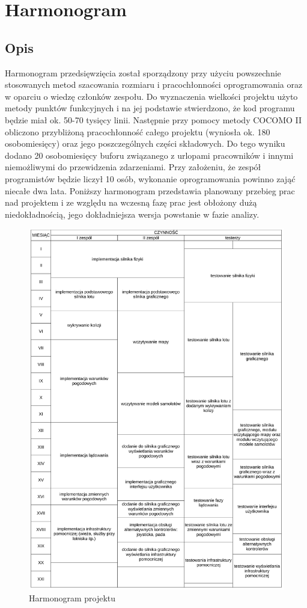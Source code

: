 \documentclass{mwrep}
\begin{document}
\chapter{Harmonogram}

\section{Opis}
Harmonogram przedsięwzięcia został sporządzony przy użyciu powszechnie stosowanych metod szacowania rozmiaru i pracochłonności oprogramowania oraz w oparciu o wiedzę członków zespołu. Do wyznaczenia wielkości projektu użyto metody punktów funkcyjnych i na jej podstawie stwierdzono, że kod programu będzie miał ok. 50-70 tysięcy linii. Następnie przy pomocy metody COCOMO II obliczono przybliżoną pracochłonność całego projektu (wyniosła ok. 180 osobomiesięcy) oraz jego poszczególnych części składowych. Do tego wyniku dodano 20 osobomiesięcy buforu związanego z urlopami pracowników i innymi niemożliwymi do przewidzenia zdarzeniami. Przy założeniu, że zespół programistów będzie liczył 10 osób, wykonanie oprogramowania powinno zająć niecałe dwa lata.
Poniższy harmonogram przedstawia planowany przebieg prac nad projektem i ze względu na wczesną fazę prac jest obłożony dużą niedokładnością, jego dokładniejsza wersja powstanie w fazie analizy. 


\begin{figure}[!h]
	\centerline{\includegraphics*[scale=0.8]{harmonogram-tabela.pdf}}
	\caption{Harmonogram projektu}
\end{figure}
\end{document}
